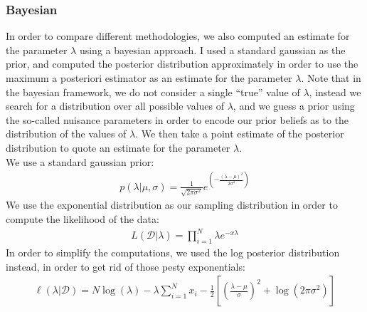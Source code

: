 \subsubsection{Bayesian}
In order to compare different methodologies, we also computed an estimate for the parameter $\lambda$ using a bayesian approach. I used a standard gaussian as the prior, and computed the posterior distribution approximately in order to use the maximum a posteriori estimator as an estimate for the parameter $\lambda$. Note that in the bayesian framework, we do not consider a single ``true'' value of $\lambda$, instead we search for a distribution over all possible values of $\lambda$, and we guess a prior using the so-called nuisance parameters in order to encode our prior beliefs as to the distribution of the values of $\lambda$. We then take a point estimate of the posterior distribution to quote an estimate for the parameter $\lambda$. \\
We use a standard gaussian prior:
\begin{align}
        p(\lambda|\mu,\sigma)=\frac{1}{\sqrt{2\pi \sigma^2}}e^\left( -\frac{(\lambda-\mu)^2}{2\sigma^2} \right)
\end{align}
We use the exponential distribution as our sampling distribution in order to compute the likelihood of the data:
\begin{align}
        L(\mathcal{D}|\lambda)=\prod_{i=1}^N\lambda e^{-x\lambda}
\end{align}
In order to simplify the computations, we used the log posterior distribution instead, in order to get rid of those pesty exponentials:
\begin{align}
        \ell(\lambda|\mathcal{D})=N\log{(\lambda)}-\lambda\sum_{i=1}^Nx_i-\frac{1}{2}\left[ \left( \frac{\lambda-\mu}{\sigma} \right)^2+\log{(2\pi \sigma^2)} \right]
\end{align}

